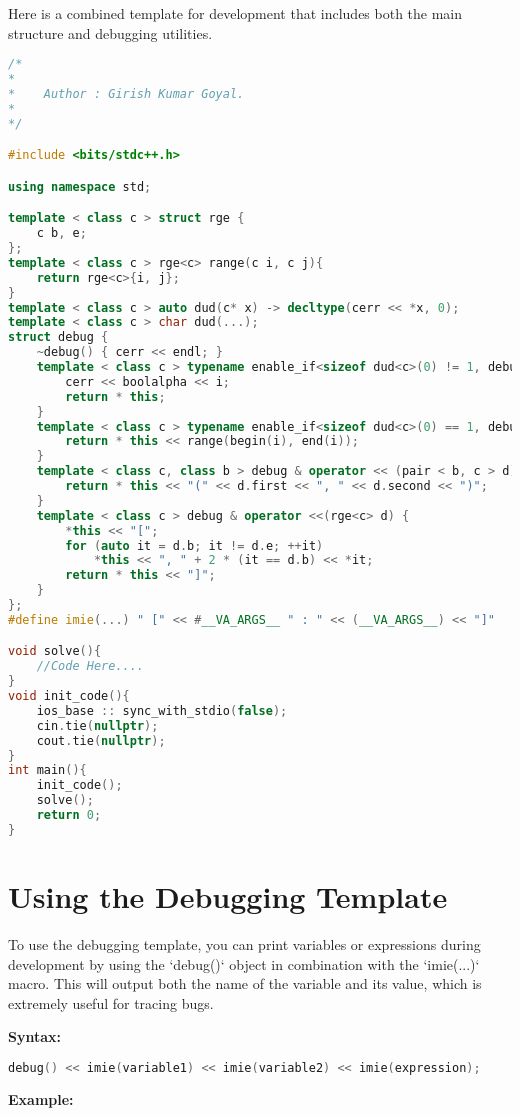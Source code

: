 Here is a combined template for development that includes both the main structure and debugging utilities.

\begin{lstlisting}[language=C++, caption={Combined Template}]
/*
*
*    Author : Girish Kumar Goyal.
*
*/

#include <bits/stdc++.h>

using namespace std;

template < class c > struct rge {
    c b, e;
};
template < class c > rge<c> range(c i, c j){
    return rge<c>{i, j};
}
template < class c > auto dud(c* x) -> decltype(cerr << *x, 0);
template < class c > char dud(...);
struct debug {
    ~debug() { cerr << endl; }
    template < class c > typename enable_if<sizeof dud<c>(0) != 1, debug&>::type operator<<(c i) {
        cerr << boolalpha << i;
        return * this;
    }
    template < class c > typename enable_if<sizeof dud<c>(0) == 1, debug&>::type operator<<(c i) {
        return * this << range(begin(i), end(i)); 
    }
    template < class c, class b > debug & operator << (pair < b, c > d) {
        return * this << "(" << d.first << ", " << d.second << ")";
    }
    template < class c > debug & operator <<(rge<c> d) {
        *this << "[";
        for (auto it = d.b; it != d.e; ++it)
            *this << ", " + 2 * (it == d.b) << *it;
        return * this << "]";
    }
};  
#define imie(...) " [" << #__VA_ARGS__ " : " << (__VA_ARGS__) << "]"

void solve(){
    //Code Here....
}
void init_code(){
    ios_base :: sync_with_stdio(false);
    cin.tie(nullptr);
    cout.tie(nullptr);
}
int main(){
    init_code();
    solve();
    return 0;
}
\end{lstlisting}
\section{Using the Debugging Template}

To use the debugging template, you can print variables or expressions during development by using the `debug()` object in combination with the `imie(...)` macro. This will output both the name of the variable and its value, which is extremely useful for tracing bugs.

\textbf{Syntax:}
\begin{lstlisting}[language=C++]
debug() << imie(variable1) << imie(variable2) << imie(expression);
\end{lstlisting}

\textbf{Example:}

